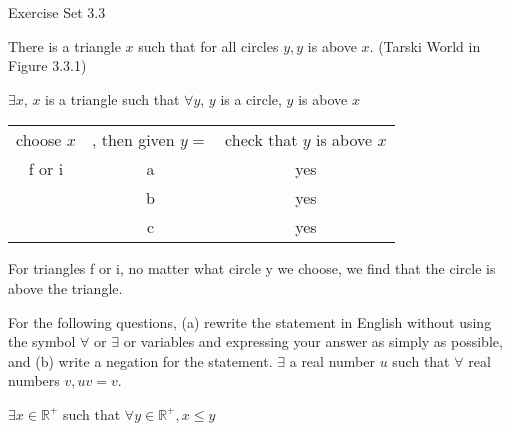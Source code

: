 \documentclass[12pt,letterpaper, onecolumn]{exam}
\begin{document}
\begin{questions}
		\begin{center}
			Exercise Set 3.3
		\end{center}
		\setcounter{question}{7}\question There is a triangle $x$ such that for all circles $y, y$ is above $x$. (Tarski World in Figure 3.3.1)
		\begin{solution}
			$\exists x$, $x$ is a triangle such that $\forall y$, $y$ is a circle, $y$ is above $x$
			\begin{center}
				\begin{tabular}{ c c c }
					choose $x$ & , then given $y=$ & check that $y$ is above $x$ \\ 
					f or i & a & yes \\  
					& b & yes \\    
					& c & yes
				\end{tabular}
			\end{center}
			For triangles f or i, no matter what circle y we choose, we find that the circle is above the triangle.
			
		\end{solution}
		
		For the following questions, (a) rewrite the statement in English without using the symbol $\forall$ or $\exists$ or variables and expressing your answer as simply as possible, and (b) write a negation for the statement.
		\setcounter{question}{15}\question $\exists$ a real number $u$ such that $\forall$ real numbers $v, uv = v$.
		\begin{solution}
		\end{solution}
		\setcounter{question}{18}\question $\exists x \in \mathbb{R^+}$ such that $\forall y \in \mathbb{R^+}, x \leq y$
		\begin{solution}
			\begin{parts}

\end{parts}
\end{solution}
\end{questions}
\end{document}
